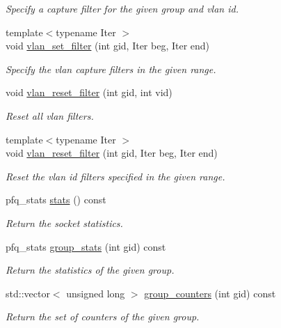 \begin{DoxyCompactItemize}
\begin{DoxyCompactList}\small\item\em Specify a capture filter for the given group and vlan id. \end{DoxyCompactList}\item 
{\footnotesize template$<$typename Iter $>$ }\\void \hyperlink{classpfq_1_1socket_aee0fbc6a5f899d081c659dbaa4a4a235}{vlan\+\_\+set\+\_\+filter} (int gid, Iter beg, Iter end)
\begin{DoxyCompactList}\small\item\em Specify the vlan capture filters in the given range. \end{DoxyCompactList}\item 
void \hyperlink{classpfq_1_1socket_a296d1eddfb061c1a658067006ddb9f37}{vlan\+\_\+reset\+\_\+filter} (int gid, int vid)
\begin{DoxyCompactList}\small\item\em Reset all vlan filters. \end{DoxyCompactList}\item 
{\footnotesize template$<$typename Iter $>$ }\\void \hyperlink{classpfq_1_1socket_a18efa89248a6d6bfb29d575744d21608}{vlan\+\_\+reset\+\_\+filter} (int gid, Iter beg, Iter end)
\begin{DoxyCompactList}\small\item\em Reset the vlan id filters specified in the given range. \end{DoxyCompactList}\item 
pfq\+\_\+stats \hyperlink{classpfq_1_1socket_a0a0a637d733613bf86d6d85168d2e37f}{stats} () const 
\begin{DoxyCompactList}\small\item\em Return the socket statistics. \end{DoxyCompactList}\item 
pfq\+\_\+stats \hyperlink{classpfq_1_1socket_a39397866032a4654c4dc000185c61e01}{group\+\_\+stats} (int gid) const 
\begin{DoxyCompactList}\small\item\em Return the statistics of the given group. \end{DoxyCompactList}\item 
std\+::vector$<$ unsigned long $>$ \hyperlink{classpfq_1_1socket_a5bb4734939ffeb151e199182ec30c4de}{group\+\_\+counters} (int gid) const 
\begin{DoxyCompactList}\small\item\em Return the set of counters of the given group. \end{DoxyCompactList}\item 

\end{DoxyCompactItemize}
